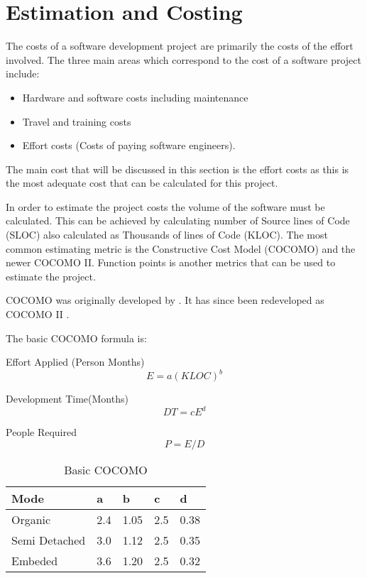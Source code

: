 \section{Estimation and Costing} 
\label{sec:estimation_and_costing}

The costs of a software development project are primarily the costs of the
effort involved. The three main areas which correspond to the cost of a software
project include:

\begin{itemize}
  \item Hardware and software costs including maintenance
  \item Travel and training costs
  \item Effort costs (Costs of paying software engineers).
\end{itemize}

The main cost that will be discussed in this section is the effort costs as this
is the most adequate cost that can be calculated for this project.

In order to estimate the project costs the volume of the software must be
calculated. This can be achieved by calculating number of Source lines of Code
(SLOC) also calculated as Thousands of lines of Code (KLOC). The most common
estimating metric is the Constructive Cost Model (COCOMO) and the newer COCOMO 
II. Function points is another metrics that can be used to estimate the project.

COCOMO was originally developed by \citet{see81}. It has since been redeveloped
as COCOMO II \citep{cocomo2}.

The basic COCOMO formula is:

Effort Applied (Person Months)
\[
  E = a(KLOC)^{b}
\]

Development Time(Months)
\[
  DT = cE^{d}
\]

People Required
\[
  P = E/D
\]

\begin{table}[H]
  \centering
  \begin{tabular}{|l|l|l|l|l|}
    \hline
    \textbf{Mode} & \textbf{a} & \textbf{b} & \textbf{c} & \textbf{d} \\ \hline
    Organic       & 2.4        & 1.05       & 2.5        & 0.38       \\ \hline
    Semi Detached & 3.0        & 1.12       & 2.5        & 0.35       \\ \hline
    Embeded       & 3.6        & 1.20       & 2.5        & 0.32       \\ \hline
  \end{tabular}
  \caption{Basic COCOMO}
\end{table}

